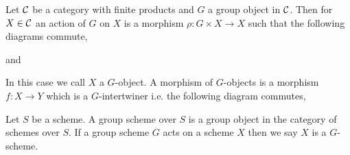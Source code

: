 \documentclass[12pt]{article}
\begin{document}
\begin{definition}
Let $\mathcal{C}$ be a category with finite products and $G$ a group object in $\mathcal{C}$. Then for $X \in \mathcal{C}$ an action of $G$ on $X$ is a morphism $\rho : G \times X \to X$ such that the following diagrams commute,
\begin{center}
\end{center}
and
\begin{center}
\end{center}
In this case we call $X$ a $G$-object. A morphism of $G$-objects is a morphism $f : X \to Y$ which is a $G$-intertwiner i.e. the following diagram commutes,
\begin{center}
\end{center}
\end{definition}

\begin{definition}
Let $S$ be a scheme. A group scheme over $S$ is a group object in the category of schemes over $S$. If a group scheme $G$ acts on a scheme $X$ then we say $X$ is a $G$-scheme.
\end{definition}
\end{document}
